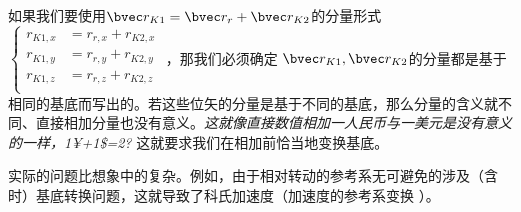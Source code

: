 如果我们要使用$\bvec r_{K1} = \bvec r_{r}+\bvec r_{K2}$的分量形式 
$
\begin{cases}
r_{K1,x}&=r_{r,x}+r_{K2,x}\\
r_{K1,y}&=r_{r,y}+r_{K2,y}\\
r_{K1,z}&=r_{r,z}+r_{K2,z}\\
\end{cases}
$
，那我们必须确定 $\bvec r_{K1}, \bvec r_{K2}$的分量都是基于相同的基底而写出的。若这些位矢的分量是基于不同的基底，那么分量的含义就不同、直接相加分量也没有意义。\textsl{这就像直接数值相加一人民币与一美元是没有意义的一样，1¥+1\$=2?} 这就要求我们在相加前恰当地变换基底。

实际的问题比想象中的复杂。例如，由于相对转动的参考系无可避免的涉及（含时）基底转换问题，这就导致了科氏加速度（加速度的参考系变换 ）。
